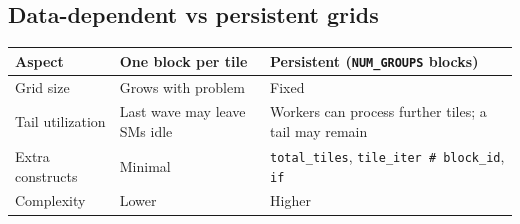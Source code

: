 \subsection*{Data-dependent vs persistent grids}

\begin{table}[htbp]
\centering\small
\begin{tabularx}{\linewidth}{@{}lXX@{}}
\toprule
\textbf{Aspect} & \textbf{One block per tile} & \textbf{Persistent (\texttt{NUM\_GROUPS} blocks)} \\
\midrule
Grid size & Grows with problem & Fixed \\
Tail utilization & Last wave may leave SMs idle & Workers can process further tiles; a tail may remain \\
Extra constructs & Minimal & \texttt{total\_tiles}, \texttt{tile\_\allowbreak{}iter \#\allowbreak{} block\_\allowbreak{}id}, \texttt{if} \\
Complexity & Lower & Higher \\
\bottomrule
\end{tabularx}
\end{table}
